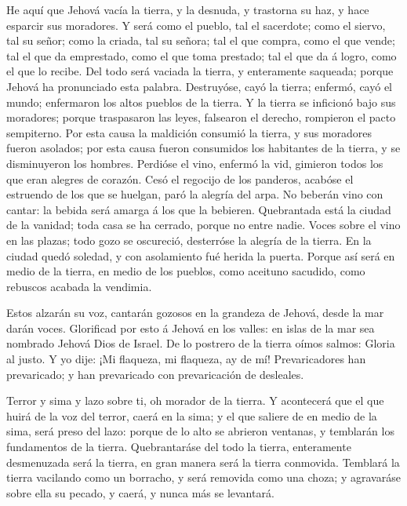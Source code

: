  He aquí que Jehová vacía la tierra, y la desnuda, y
trastorna su haz, y hace esparcir sus moradores.  Y será
como el pueblo, tal el sacerdote; como el siervo, tal su señor; como la
criada, tal su señora; tal el que compra, como el que vende; tal el que
da emprestado, como el que toma prestado; tal el que da á logro, como el
que lo recibe.  Del todo será vaciada la tierra, y
enteramente saqueada; porque Jehová ha pronunciado esta palabra.
 Destruyóse, cayó la tierra; enfermó, cayó el mundo;
enfermaron los altos pueblos de la tierra.  Y la tierra se
inficionó bajo sus moradores; porque traspasaron las leyes, falsearon el
derecho, rompieron el pacto sempiterno.  Por esta causa la
maldición consumió la tierra, y sus moradores fueron asolados; por esta
causa fueron consumidos los habitantes de la tierra, y se disminuyeron
los hombres.  Perdióse el vino, enfermó la vid, gimieron
todos los que eran alegres de corazón.  Cesó el regocijo de
los panderos, acabóse el estruendo de los que se huelgan, paró la
alegría del arpa.  No beberán vino con cantar: la bebida
será amarga á los que la bebieren.  Quebrantada está la
ciudad de la vanidad; toda casa se ha cerrado, porque no entre nadie.
 Voces sobre el vino en las plazas; todo gozo se oscureció,
desterróse la alegría de la tierra.  En la ciudad quedó
soledad, y con asolamiento fué herida la puerta.  Porque
así será en medio de la tierra, en medio de los pueblos, como aceituno
sacudido, como rebuscos acabada la vendimia.

 Estos alzarán su voz, cantarán gozosos en la grandeza de
Jehová, desde la mar darán voces.  Glorificad por esto á
Jehová en los valles: en islas de la mar sea nombrado Jehová Dios de
Israel.  De lo postrero de la tierra oímos salmos: Gloria
al justo. Y yo dije: ¡Mi flaqueza, mi flaqueza, ay de mí! Prevaricadores
han prevaricado; y han prevaricado con prevaricación de desleales.

 Terror y sima y lazo sobre ti, oh morador de la tierra.
 Y acontecerá que el que huirá de la voz del terror, caerá
en la sima; y el que saliere de en medio de la sima, será preso del
lazo: porque de lo alto se abrieron ventanas, y temblarán los
fundamentos de la tierra.  Quebrantaráse del todo la
tierra, enteramente desmenuzada será la tierra, en gran manera será la
tierra conmovida.  Temblará la tierra vacilando como un
borracho, y será removida como una choza; y agravaráse sobre ella su
pecado, y caerá, y nunca más se levantará.


